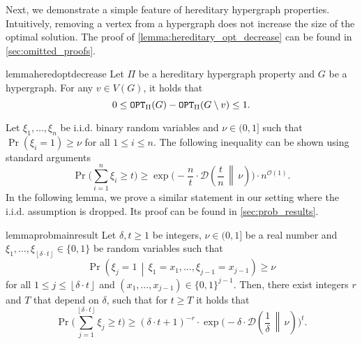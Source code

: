 \documentclass[letterpaper,11pt]{article}
\newcommand{\floor}[1]{ {\left\lfloor #1 \right\rfloor}}
\newcommand{\1}[1]{\mathds{1}\left[#1\right]}
\newcommand{\D}[2]{\mathcal{D}\left(#1\, \middle\|\,#2 \right)}
\newcommand{\OPT}{\textnormal{\texttt{OPT}}}
\newcommand{\Oh}{\mathcal{O}}
\begin{document}
Next, we demonstrate a simple feature of hereditary hypergraph properties.
Intuitively, removing a vertex from a hypergraph does not increase the size
of the optimal solution. The proof of \cref{lemma:hereditary_opt_decrease}
can be found in \cref{sec:omitted_proofs}.
\begin{restatable}{lemma}{heredoptdecrease}
	\label{lemma:hereditary_opt_decrease}
	Let $\Pi$ be a hereditary hypergraph property and $G$ be a hypergraph.
	For any $v \in V(G)$, it holds that
	\begin{equation*}
		 0 \leq \OPT_{\Pi}(G) - \OPT_{\Pi}(G \setminus v ) \leq 1.
	\end{equation*}
\end{restatable}

Let $\xi_1, \ldots, \xi_n$ be i.i.d. binary random variables and $\nu \in (0,1]$ such that $\Pr\left( \xi_i = 1 \right) \geq \nu$
for all $1 \leq i \leq n$.
The following inequality can be shown using standard arguments
\begin{equation*}
	\Pr\Biggl(\sum_{i = 1}^{n} \xi_i \geq t\Biggr) \geq \exp\Biggl(- \frac{n}{t} \cdot \D{\frac{t}{n}}{\nu}\Biggr) \cdot n^{\Oh(1)}.
\end{equation*}
In the following lemma, we prove a similar statement in our setting where the i.i.d. assumption is dropped. 
Its proof can be found in \cref{sec:prob_results}.

\begin{restatable}{lemma}{probmainresult}\label{lemma:prob_main_result}
	Let $\delta, t \geq 1$ be integers, $\nu \in (0,1]$ be a real number
	and $\xi_1, \ldots, \xi_{\left\lfloor \delta \cdot t \right\rfloor} \in
	\{0,1\}$ be random variables such that
	\begin{equation*}
		\Pr\left( \xi_j =1\,\middle|\, \xi_1 = x_1,\ldots,\xi_{j-1}
	= x_{j - 1}\right)\geq \nu
	\end{equation*}
	for all $1 \leq j \leq \left\lfloor \delta \cdot t \right\rfloor$ and $\left( x_1, \ldots,
x_{j-1} \right) \in \{0,1\}^{j-1}$. 
Then, there exist integers $r$ and $T$ that depend on
$\delta$, such that for $t \geq T$ it holds that
			\begin{equation*}
				\Pr\biggl( \sum_{j = 1}^{\floor{\delta \cdot t}} \xi_j \geq t\biggr) \geq \left( \delta\cdot t + 1 \right) ^{-r} \cdot \exp\biggl( -\delta \cdot \D{\frac{1}{\delta}}{\nu}\biggr)^{t}.
			\end{equation*}
\end{restatable}
\end{document}
